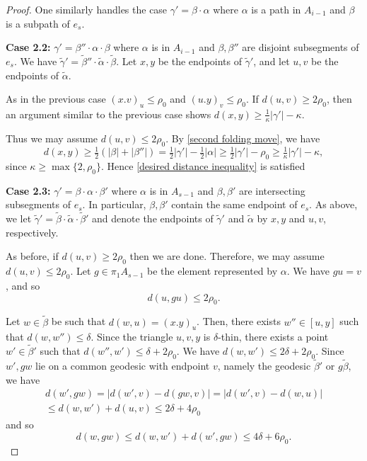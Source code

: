 \documentclass[article, 12pt]{amsart}
\numberwithin{equation}{section}
\theoremstyle{definition}
\newcommand{\tild}[1]{\widetilde{#1}}
\begin{document}
\begin{proof}
    One similarly handles the case $\gamma'=\beta \cdot \alpha$ where $\alpha$ is a path in $A_{i-1}$ and $\beta$ is a subpath of $e_s$. 
    
    \textbf{Case 2.2:} $\gamma' = \beta'' \cdot \alpha \cdot \beta$ where $\alpha$ is in $A_{i-1}$ and $\beta,\beta''$ are disjoint subsegments of $e_s$.
    We have $\tild\gamma'=\tild\beta'' \cdot \tild\alpha \cdot \tild \beta$.
    Let $x,y$ be the endpoints of $\tild \gamma'$, and let $u,v$ be the endpoints of $\tild \alpha$.
    

    As in the previous case $(x.v)_{u}\le \rho_0$ and $(u.y)_{v}\le \rho_0$. 
    If $d(u,v)\ge 2\rho_0$, then an argument similar to the previous case shows 
    $d(x,y)\ge \tfrac{1}{\kappa}|\gamma'|-\kappa$.

    Thus we may assume $d(u,v)\le 2\rho_0$.
    By \ref{second folding move}, we have 
    \begin{equation*}
        d(x,y)\ge \tfrac 12(|\beta|+|\beta''|)= \tfrac 12|\gamma'|-\tfrac 12|\alpha|\ge \tfrac 12|\gamma'|-\rho_0\ge \tfrac 1\kappa|\gamma'|-\kappa,
    \end{equation*}
    since $\kappa\ge \max\{2,\rho_0\}$. 
    Hence \ref{desired distance inequality} is satisfied 
    
    \textbf{Case 2.3:} $\gamma' = \beta \cdot \alpha \cdot \beta'$ where $\alpha$ is in $A_{s-1}$ and $\beta,\beta'$ are intersecting subsegments of $e_s$.
    In particular, $\beta,\beta'$ contain the same endpoint of $e_s$.
    As above, we let $\tild\gamma'=\tild\beta \cdot \tild\alpha \cdot \tild\beta'$ and denote the endpoints of $\tild\gamma'$ and $\tild\alpha$ by $x,y$ and $u,v$, respectively.
    
    As before, if $d(u,v)\ge 2\rho_0$ then we are done. 
    Therefore, we may assume $d(u,v)\le 2\rho_0$.
    Let $g\in \pi_1A_{s-1}$ be the element represented by $\alpha$. We have $gu=v$, and so $$d(u,gu)\le 2\rho_0.$$


    Let $w\in \tild\beta$ be such that $d(w,u)=(x.y)_u$.
    Then, there exists $w''\in [u,y]$ such that $d(w,w'')\le \delta$.
    Since the triangle $u,v,y$ is $\delta$-thin, there exists a point $w'\in\tild \beta'$ such that $d(w'',w')\le \delta+2\rho_0$.
    We have $d(w,w')\le 2\delta+2\rho_0$.
    Since $w',gw$ lie on a common geodesic with endpoint $v$, namely the geodesic $\tilde \beta'$ or $g\tilde \beta$, we have
    \begin{multline*}
        d(w',gw)= |d(w',v)-d(gw,v)| = |d(w',v)-d(w,u)|\\
        \le d(w,w')+d(u,v)\le 2\delta +4\rho_0
    \end{multline*}
    and so
    $$d(w,gw)\le d(w,w')+d(w',gw)\le  4\delta+6\rho_0.$$
    

\end{proof}
\end{document}
